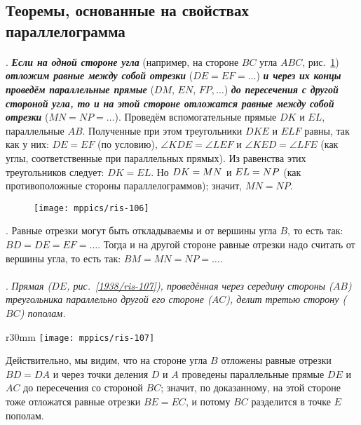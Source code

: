 \subsection*{Теоремы, основанные на свойствах параллелограмма}

\paragraph{}\label{1938/95}
.
\textbf{\emph{Если на одной стороне угла}} (например, на стороне $BC$ угла $ABC$, рис.~\ref{1938/ris-106}) \textbf{\emph{отложим равные между собой отрезки}} ($DE=EF=\dots$) \textbf{\emph{и через их концы проведём параллельные прямые}} ($DM$, $EN$, $FP,\dots$) \textbf{\emph{до пересечения с другой стороной угла, то и на этой стороне отложатся равные между собой отрезки}} ($MN=NP=\dots$).
Проведём вспомогательные прямые $DK$ и $EL$, параллельные $AB$.
Полученные при этом треугольники $DKE$ и $ELF$ равны, так как у них:
$DE=EF$ (по условию), $\angle KDE=\angle LEF$ и $\angle KED = \angle LFE$ (как углы, соответственные при параллельных прямых).
Из равенства этих треугольников следует:
$DK=EL$.
Но $DK\z=MN$ и $EL\z=NP$ (как противоположные стороны параллелограммов);
значит, $MN=NP$.

\begin{figure}[!ht]
\centering
\texttt{[image: mppics/ris-106]}
\caption{}\label{1938/ris-106}
\end{figure}

{\small
\smallskip
\mbox{.}
Равные отрезки могут быть откладываемы и от вершины угла $B$, то есть
так:
$BD=DE= EF=\dots$.
Тогда и на другой стороне равные отрезки надо считать от вершины угла, то есть так:
$BM=MN=NP=\dots$.

}

\paragraph{}\label{1938/96}
\mbox{.}
\emph{Прямая \emph{($DE$, рис.~\ref{1938/ris-107}),} проведённая через середину стороны ($AB$) треугольника параллельно другой его стороне ($AC$), делит третью сторону ($BC$) пополам.}

\begin{wrapfigure}[8]{r}{30mm}
\vskip-4mm
\centering
\texttt{[image: mppics/ris-107]}
\caption{}\label{1938/ris-107}
\end{wrapfigure}


Действительно, мы видим, что на стороне угла $B$ отложены равные отрезки $BD=DA$ и через точки деления $D$ и $A$ проведены параллельные прямые $DE$ и $AC$ до пересечения со стороной $BC$;
значит, по доказанному, на этой стороне тоже отложатся равные отрезки $BE=EC$, и потому $BC$ разделится в точке $E$ пополам.


